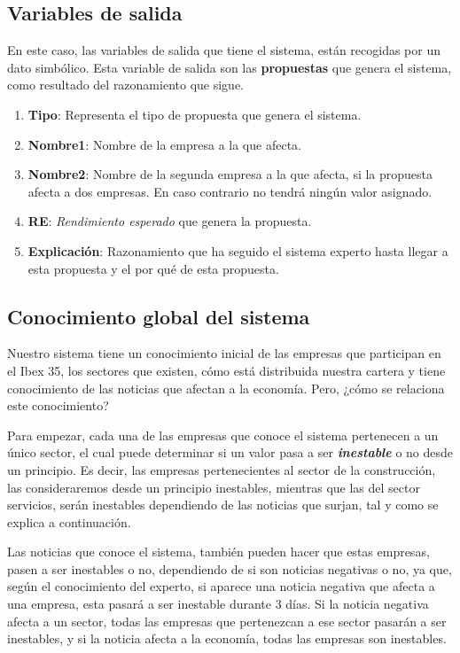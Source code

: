 \documentclass[10pt,spanish]{article}
\theoremstyle{plain}
\theoremstyle{definition}
\begin{document}
\subsection{Variables de salida}

En este caso, las variables de salida que tiene el sistema, están recogidas por un dato simbólico. Esta variable de salida son las \textbf{propuestas} que genera el sistema, como resultado del razonamiento que sigue. 
\begin{enumerate}[$\diamond$]
    \item \textbf{Tipo}: Representa el tipo de propuesta que genera el sistema.
    \item \textbf{Nombre1}: Nombre de la empresa a la que afecta.
    \item \textbf{Nombre2}: Nombre de la segunda empresa a la que afecta, si la propuesta afecta a dos empresas. En caso contrario no tendrá ningún valor asignado.
    \item \textbf{RE}: \textit{Rendimiento esperado} que genera la propuesta.
    \item \textbf{Explicación}: Razonamiento que ha seguido el sistema experto hasta llegar a esta propuesta y el por qué de esta propuesta.
\end{enumerate}

\subsection{Conocimiento global del sistema}

Nuestro sistema tiene un conocimiento inicial de las empresas que participan en el Ibex 35, los sectores que existen, cómo está distribuida nuestra cartera y tiene conocimiento de las noticias que afectan a la economía. Pero, ¿cómo se relaciona este conocimiento?

Para empezar, cada una de las empresas que conoce el sistema pertenecen a un único sector, el cual puede determinar si un valor pasa a ser \textbf{\textit{inestable}} o no desde un principio. Es decir, las empresas pertenecientes al sector de la construcción, las consideraremos desde un principio inestables, mientras que las del sector servicios, serán inestables dependiendo de las noticias que surjan, tal y como se explica a continuación.

Las noticias que conoce el sistema, también pueden hacer que estas empresas, pasen a ser inestables o no, dependiendo de si son noticias negativas o no, ya que, según el conocimiento del experto, si aparece una noticia negativa que afecta a una empresa, esta pasará a ser inestable durante 3 días. Si la noticia negativa afecta a un sector, todas las empresas que pertenezcan a ese sector pasarán a ser inestables, y si la noticia afecta a la economía, todas las empresas son inestables.
\end{document}
